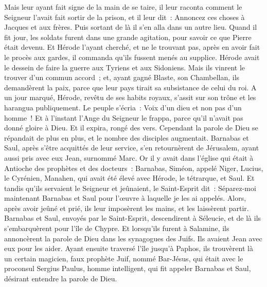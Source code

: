 \begin{multicols}{2}
Mais leur ayant fait signe de la main de se taire, il leur raconta comment le Seigneur l'avait fait sortir de la prison, et il leur dit~: Annoncez ces choses à Jacques et aux frères. Puis sortant de là il s'en alla dans un autre lieu.
Quand il fit jour, les soldats furent dans une grande agitation, pour savoir ce que Pierre était devenu.
Et Hérode l'ayant cherché, et ne le trouvant pas, après en avoir fait le procès aux gardes, il commanda qu'ils fussent menés au supplice.
Hérode avait le dessein de faire la guerre aux Tyriens et aux Sidoniens. Mais ils vinrent le trouver d'un commun accord~; et, ayant gagné Blaste, son Chambellan, ils demandèrent la paix, parce que leur pays tirait sa subsistance de celui du roi.
A un jour marqué, Hérode, revêtu de ses habits royaux, s'assit sur son trône et les harangua publiquement.
Le peuple s'écria~: Voix d'un dieu et non pas d'un homme~!
Et à l'instant l'Ange du Seigneur le frappa, parce qu'il n'avait pas donné gloire à Dieu. Et il expira, rongé des vers.
Cependant la parole de Dieu se répandait de plus en plus, et le nombre des disciples augmentait.
Barnabas et Saul, après s'être acquittés de leur service, s'en retournèrent de Jérusalem, ayant aussi pris avec eux Jean, surnommé Marc.
\VerseOne{}Or il y avait dans l'église qui était à Antioche des prophètes et des docteurs~: Barnabas, Siméon, appelé Niger, Lucius, le Cyrénien, Manahen, qui avait été élevé avec Hérode, le tétrarque, et Saul.
Et tandis qu'ils servaient le Seigneur et jeûnaient, le Saint-Esprit dit~: Séparez-moi maintenant Barnabas et Saul pour l'œuvre à laquelle je les ai appelés.
Alors, après avoir jeûné et prié, ils leur imposèrent les mains, et les laissèrent partir.
Barnabas et Saul, envoyés par le Saint-Esprit, descendirent à Séleucie, et de là ils s'embarquèrent pour l'île de Chypre.
Et lorsqu'ils furent à Salamine, ils annoncèrent la parole de Dieu dans les synagogues des Juifs. Ils avaient Jean avec eux pour les aider.
Ayant ensuite traversé l'île jusqu'à Paphos, ils trouvèrent là un certain magicien, faux prophète Juif, nommé Bar-Jésus,
qui était avec le proconsul Sergius Paulus, homme intelligent, qui fit appeler Barnabas et Saul, désirant entendre la parole de Dieu.

\end{multicols}
